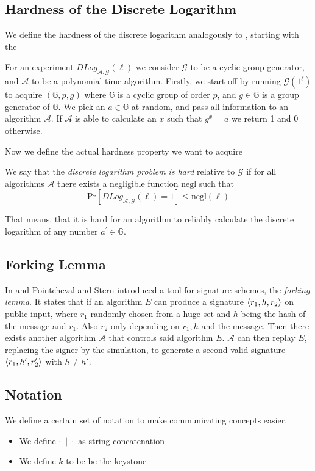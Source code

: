 \subsection{Hardness of the Discrete Logarithm}
  We define the hardness of the discrete logarithm analogously to \cite{katz2014introduction}, starting with the

  \begin{definition}
    For an experiment \(DLog_{\mathcal{A}, \mathcal{G}}(\ell)\) we consider \(\mathcal{G}\) to be a cyclic group generator, and \(\mathcal{A}\) to be a polynomial-time algorithm.
    Firstly, we start off by running \(\mathcal{G}(1^\ell)\) to acquire \((\mathbb{G}, p, g)\) where $\mathbb{G}$ is a cyclic group of order \(p\), and \(g\in\mathbb{G}\) is a group generator of \(\mathbb{G}\).
    We pick an \(a\in\mathbb{G}\) at random, and pass all information to an algorithm \(\mathcal{A}\).
    If \(\mathcal{A}\) is able to calculate an \(x\) such that \(g^x = a\) we return 1 and 0 otherwise.
  \end{definition}

  Now we define the actual hardness property we want to acquire

  \begin{definition}
    We say that the \textit{discrete logarithm problem is hard} relative to \(\mathcal{G}\) if for all algorithms \(\mathcal{A}\) there exists a negligible function \(\mathrm{negl}\) such that
      \[\mathrm{Pr}[DLog_{\mathcal{A}, \mathcal{G}}(\ell) = 1] \leq \mathrm{negl}(\ell)\]
  \end{definition}

  That means, that it is hard for an algorithm to reliably calculate the discrete logarithm of any number \(a^\prime\in\mathbb{G}\).

\subsection{Forking Lemma}
  In \cite{pcstern96} and \cite{pointcheval2000security}  Pointcheval and Stern introduced a tool for signature schemes, the \textit{forking lemma}. 
  It states that if an algorithm \(E\) can produce a signature \(\langle r_1, h, r_2 \rangle\) on public input, where \(r_1\) randomly chosen from a huge set and \(h\) being the hash of the message and \(r_1\).
  Also \(r_2\) only depending on \(r_1, h\) and the message.
  Then there exists another algorithm \(\mathcal{A}\) that controls said algorithm \(E\).
  \(\mathcal{A}\) can then replay \(E\), replacing the signer by the simulation, to generate a second valid signature \(\langle r_1, h', r_2' \rangle\) with \(h\neq h'\).

\subsection{Notation}
  We define a certain set of notation to make communicating concepts easier.
  \begin{itemize}
    \item We define \(\cdot \| \cdot \) as string concatenation
    \item We define \(k\) to be be the keystone
  \end{itemize}